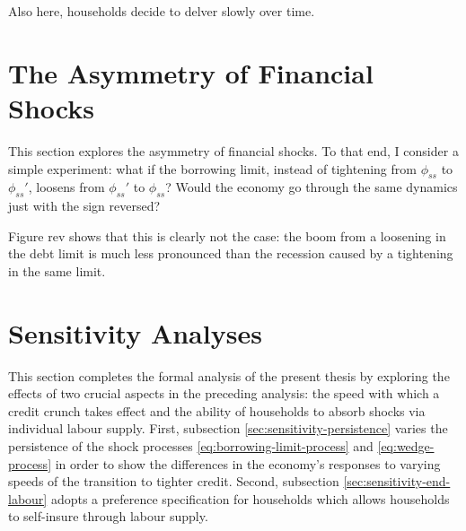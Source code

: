 \documentclass[12pt]{article} %
\numberwithin{equation}{section} %
\numberwithin{figure}{section}
\numberwithin{table}{section}
\begin{document}
Also here, households decide to delver slowly over time.


\section{The Asymmetry of Financial Shocks}
\label{sec:asymmetry}

This section explores the asymmetry of financial shocks. To that end, I consider a simple experiment: what if the borrowing limit, instead of tightening from $\phi_{ss}$ to $\phi_{ss}'$, loosens from $\phi_{ss}'$ to $\phi_{ss}$? Would the economy go through the same dynamics just with the sign reversed?

Figure rev shows that this is clearly not the case: the boom from a loosening in the debt limit is much less pronounced than the recession caused by a tightening in the same limit.

\section{Sensitivity Analyses}
\label{sec:sensitivity}

This section completes the formal analysis of the present thesis by exploring the effects of two crucial aspects in the preceding analysis: the speed with which a credit crunch takes effect and the ability of households to absorb shocks via individual labour supply. First, subsection \ref{sec:sensitivity-persistence} varies the persistence of the shock processes \eqref{eq:borrowing-limit-process} and \eqref{eq:wedge-process} in order to show the differences in the economy's responses to varying speeds of the transition to tighter credit. Second, subsection \ref{sec:sensitivity-end-labour} adopts a preference specification for households which allows households to self-insure through labour supply.
\end{document}
